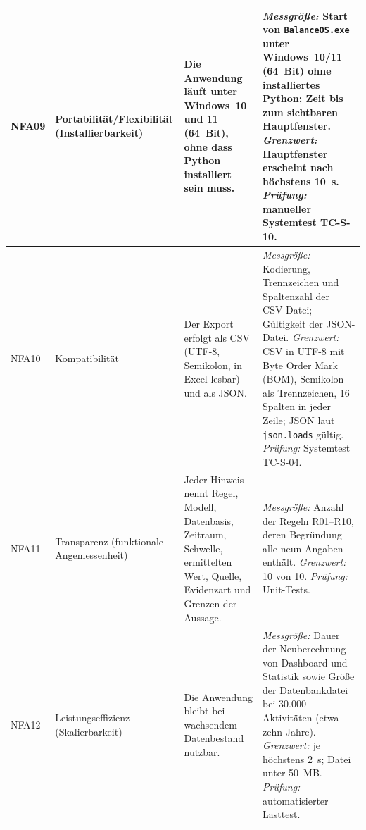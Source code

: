 \begin{longtable}{@{}L{1.2cm}L{3.0cm}L{5.9cm}L{5.1cm}@{}}
  \midrule
  NFA09 & Portabilität/\allowbreak Flexibilität (Installierbarkeit)
    & Die Anwendung läuft unter Windows~10 und 11 (64~Bit), ohne dass Python installiert sein muss.
    & \textit{Messgröße:} Start von \texttt{BalanceOS.exe} unter Windows~10/11 (64~Bit) ohne installiertes Python; Zeit bis zum sichtbaren Hauptfenster.\newline
      \textit{Grenzwert:} Hauptfenster erscheint nach höchstens 10~s.\newline
      \textit{Prüfung:} manueller Systemtest TC-S-10. \\
  \midrule
  NFA10 & Kompatibilität
    & Der Export erfolgt als CSV (UTF-8, Semikolon, in Excel lesbar) und als JSON.
    & \textit{Messgröße:} Kodierung, Trennzeichen und Spaltenzahl der CSV-Datei; Gültigkeit der JSON-Datei.\newline
      \textit{Grenzwert:} CSV in UTF-8 mit Byte Order Mark (BOM), Semikolon als Trennzeichen, 16 Spalten in jeder Zeile; JSON laut \texttt{json.loads} gültig.\newline
      \textit{Prüfung:} Systemtest TC-S-04. \\
  \midrule
  NFA11 & Transparenz (funktionale Angemessenheit)
    & Jeder Hinweis nennt Regel, Modell, Datenbasis, Zeitraum, Schwelle, ermittelten Wert, Quelle, Evidenzart und Grenzen der Aussage.
    & \textit{Messgröße:} Anzahl der Regeln R01--R10, deren Begründung alle neun Angaben enthält.\newline
      \textit{Grenzwert:} 10 von 10.\newline
      \textit{Prüfung:} Unit-Tests. \\
  \midrule
  NFA12 & Leistungs\-effizienz (Skalierbarkeit)
    & Die Anwendung bleibt bei wachsendem Datenbestand nutzbar.
    & \textit{Messgröße:} Dauer der Neuberechnung von Dashboard und Statistik sowie Größe der Datenbankdatei bei 30.000 Aktivitäten (etwa zehn Jahre).\newline
      \textit{Grenzwert:} je höchstens 2~s; Datei unter 50~MB.\newline
      \textit{Prüfung:} automatisierter Lasttest. \\
\end{longtable}
\endgroup
{}

